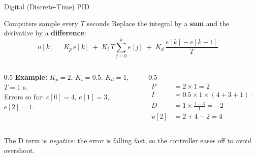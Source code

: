 \documentclass[aspectratio=169]{beamer}
\begin{document}
	\begin{frame}{Digital (Discrete-Time) PID}
		\begin{block}{Computers sample every $T$ seconds}
			Replace the integral by a \textbf{sum} and the derivative by a \textbf{difference}:
			\[
			u[k] = K_p\,e[k] \;+\; K_i\,T\sum_{j=0}^{k} e[j] \;+\; K_d\,\frac{e[k]-e[k-1]}{T}
			\]
		\end{block}
		\begin{columns}[T]
			\begin{column}{0.5\textwidth}
				\textbf{Example:} $K_p = 2$, $K_i = 0.5$, $K_d = 1$, $T = 1$ s.\\
				Errors so far: $e[0] = 4$, $e[1] = 3$, $e[2] = 1$.
			\end{column}
			\begin{column}{0.5\textwidth}
				\small
				\begin{align*}
					P &= 2\times1 = 2\\
					I &= 0.5\times1\times(4+3+1) = 4\\
					D &= 1\times\tfrac{1-3}{1} = -2\\
					u[2] &= 2 + 4 - 2 = \boxed{4}
				\end{align*}
			\end{column}
		\end{columns}
		\vspace{0.1cm}
		\footnotesize\centering The D term is \emph{negative}: the error is falling fast, so the controller eases off to avoid overshoot.
	\end{frame}
\end{document}
